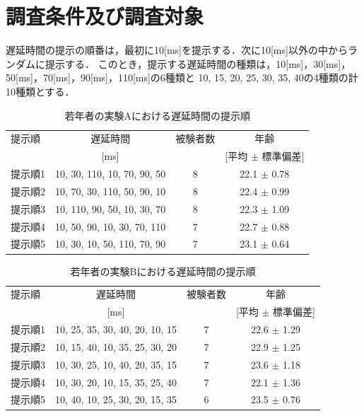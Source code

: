 \section{調査条件及び調査対象}
遅延時間の提示の順番は，最初に10[ms]を提示する．次に10[ms]以外の中からランダムに提示する．
このとき，提示する遅延時間の種類は，10[ms]，30[ms]，50[ms]，70[ms]，90[ms]，110[ms]の6種類と
10, 15, 20, 25, 30, 35, 40の4種類の計10種類とする．
\begin{table}[tbp]
  \caption{若年者の実験Aにおける遅延時間の提示順}
  \label{table:young_a}
  \centering
  \begin{tabular}{lccc}
    \hline
    提示順 & 遅延時間 & 被験者数 & 年齢\\
    　& [ms] & & [平均 $\pm$ 標準偏差]\\
    \hline \hline
    提示順1  & 10, 30, 110, 10, 70, 90, 50  & 8 & 22.1 $\pm$ 0.78\\
    提示順2  & 10, 70, 30, 110, 50, 90, 10  & 8 & 22.4 $\pm$ 0.99\\
    提示順3  & 10, 110, 90, 50, 10, 30, 70  & 8 & 22.3 $\pm$ 1.09\\
    提示順4  & 10, 50, 90, 10, 30, 70, 110  & 7 & 22.7 $\pm$ 0.88\\
    提示順5  & 10, 30, 10, 50, 110, 70, 90  & 7 & 23.1 $\pm$ 0.64
\\
    \hline
  \end{tabular}
\end{table}
\begin{table}[tbp]
  \caption{若年者の実験Bにおける遅延時間の提示順}
  \label{table:young_b}
  \centering
  \begin{tabular}{lccc}
    \hline
    提示順 & 遅延時間 & 被験者数 & 年齢\\
    　& [ms] & & [平均 $\pm$ 標準偏差]\\
    \hline \hline
    提示順1  & 10, 25, 35, 30, 40, 20, 10, 15  & 7 & 22.6 $\pm$ 1.29\\
    提示順2  & 10, 15, 40, 10, 35, 25, 30, 20  & 7 & 22.9 $\pm$ 1.25\\
    提示順3  & 10, 30, 25, 10, 40, 20, 35, 15  & 7 & 23.6 $\pm$ 1.18\\
    提示順4  & 10, 30, 20, 10, 15, 35, 25, 40  & 7 & 22.1 $\pm$ 1.36\\
    提示順5  & 10, 40, 10, 25, 30, 20, 15, 35  & 6 & 23.5 $\pm$ 0.76
\\
    \hline
  \end{tabular}
\end{table}
